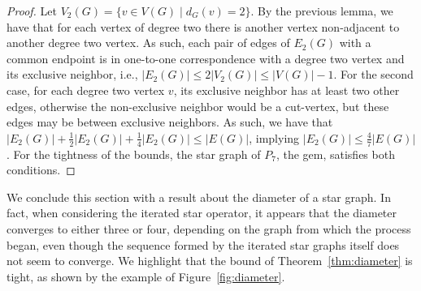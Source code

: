 \begin{proof}
    Let $V_2(G) = \{v \in V(G) \mid d_G(v) = 2\}$.
    By the previous lemma, we have that for each vertex of degree two there is another vertex non-adjacent to another degree two vertex.
    As such, each pair of edges of $E_2(G)$ with a common endpoint is in one-to-one correspondence with a degree two vertex and its exclusive neighbor, i.e., $|E_2(G)| \leq 2|V_2(G)| \leq |V(G)| - 1$.
    For the second case, for each degree two vertex $v$, its exclusive neighbor has at least two other edges, otherwise the non-exclusive neighbor would be a cut-vertex, but these edges may be between exclusive neighbors.
    As such, we have that $|E_2(G)| + \frac{1}{2}|E_2(G)| + \frac{1}{4}|E_2(G)| \leq |E(G)|$, implying $|E_2(G)| \leq \frac{4}{7}|E(G)|$.
    For the tightness of the bounds, the star graph of $P_7$, the gem, satisfies both conditions.
\end{proof}

We conclude this section with a result about the diameter of a star graph.
In fact, when considering the iterated star operator, it appears that the diameter converges to either three or four, depending on the graph from which the process began, even though the sequence formed by the iterated star graphs itself does not seem to converge.
We highlight that the bound of Theorem~\ref{thm:diameter} is tight, as shown by the example of Figure~\ref{fig:diameter}.


